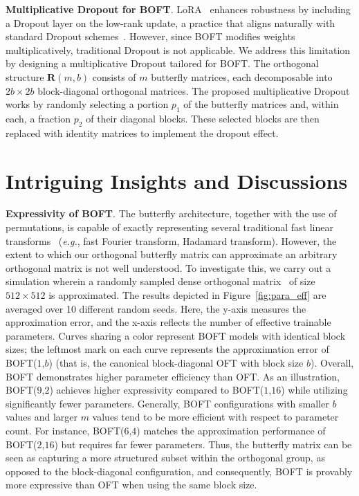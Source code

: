 \textbf{Multiplicative Dropout for BOFT}. LoRA~\cite{hulora2022} enhances robustness by including a Dropout layer on the low-rank update, a practice that aligns naturally with standard Dropout schemes~\cite{srivastava2014dropout}. However, since BOFT modifies weights multiplicatively, traditional Dropout is not applicable. We address this limitation by designing a multiplicative Dropout tailored for BOFT. The orthogonal structure $\bm{R}(m,b)$ consists of $m$ butterfly matrices, each decomposable into $2b\times 2b$ block-diagonal orthogonal matrices. The proposed multiplicative Dropout works by randomly selecting a portion $p_1$ of the butterfly matrices and, within each, a fraction $p_2$ of their diagonal blocks. These selected blocks are then replaced with identity matrices to implement the dropout effect.

\section{Intriguing Insights and Discussions}

\textbf{Expressivity of BOFT}. The butterfly architecture, together with the use of permutations, is capable of exactly representing several traditional fast linear transforms~\cite{dao2019learning,dao2019kaleidoscope} (\emph{e.g.}, fast Fourier transform, Hadamard transform). However, the extent to which our orthogonal butterfly matrix can approximate an arbitrary orthogonal matrix is not well understood. To investigate this, we carry out a simulation wherein a randomly sampled dense orthogonal matrix~\cite{anderson1987generation} of size $512\times 512$ is approximated. The results depicted in Figure~\ref{fig:para_eff} are averaged over 10 different random seeds. Here, the y-axis measures the approximation error, and the x-axis reflects the number of effective trainable parameters. Curves sharing a color represent BOFT models with identical block sizes; the leftmost mark on each curve represents the approximation error of BOFT($1$,$b$) (that is, the canonical block-diagonal OFT with block size $b$). Overall, BOFT demonstrates higher parameter efficiency than OFT. As an illustration, BOFT($9$,$2$) achieves higher expressivity compared to BOFT($1$,$16$) while utilizing significantly fewer parameters. Generally, BOFT configurations with smaller $b$ values and larger $m$ values tend to be more efficient with respect to parameter count. For instance, BOFT($6$,$4$) matches the approximation performance of BOFT($2$,$16$) but requires far fewer parameters. Thus, the butterfly matrix can be seen as capturing a more structured subset within the orthogonal group, as opposed to the block-diagonal configuration, and consequently, BOFT is provably more expressive than OFT when using the same block size.

